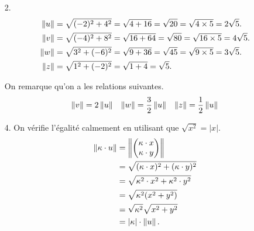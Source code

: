 {}{
	\begin{enumerate}
		\item[2.]
			\begin{align*}
				\left\Vert u \right\Vert &= \sqrt{(-2)^2 + 4^2} = \sqrt{4 + 16} = \sqrt{20} = \sqrt{4 \times 5} = 2 \sqrt{5}. \\
				\left\Vert v \right\Vert &= \sqrt{(-4)^2 + 8^2} = \sqrt{16 + 64} = \sqrt{80} = \sqrt{16 \times 5} = 4\sqrt{5}. \\
				\left\Vert w \right\Vert &= \sqrt{3^2 + (-6)^2} = \sqrt{9 + 36} = \sqrt{45} = \sqrt{9 \times 5} = 3 \sqrt{5}. \\
				\left\Vert z \right\Vert &= \sqrt{1^2 + (-2)^2} = \sqrt{1 + 4} = \sqrt{5}.
			\end{align*}
	
		On remarque qu'on a les relations suivantes.
			\begin{align*}
				\left\Vert v \right\Vert = 2 \left\Vert u \right\Vert && \left\Vert w \right\Vert = \dfrac32 \left\Vert u \right\Vert && \left\Vert z \right\Vert = \dfrac12 \left\Vert u \right\Vert
			\end{align*}
	
		\item[4.]
			On vérifie l'égalité calmement en utilisant que $\sqrt{x^2} = |x|$.
				\begin{align*}
					\left\Vert \kappa \cdot u \right\Vert &= \left\Vert  \begin{pmatrix} \kappa \cdot x \\ \kappa \cdot y \end{pmatrix} \right\Vert \\
										&= \sqrt{ (\kappa \cdot x)^2 + (\kappa \cdot y)^2} \\
										&= \sqrt{ \kappa^2 \cdot x^2 + \kappa^2 \cdot y^2} \\
										&= \sqrt{ \kappa^2  (x^2 + y^2) } \\
										&= \sqrt{\kappa^2} \sqrt{x^2 + y^2} \\
										&= |\kappa| \cdot \left\Vert u \right\Vert.
				\end{align*}
	\end{enumerate}
}


